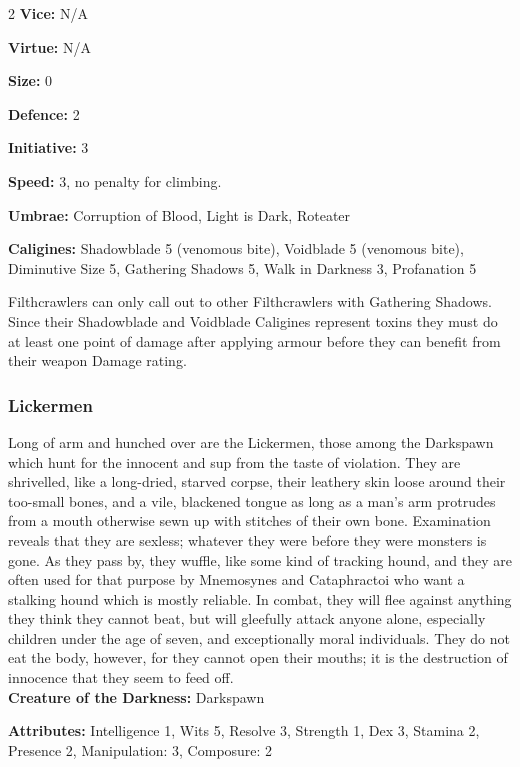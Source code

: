 \begin{multicols}{2}
\noindent \textbf{Vice:} N/A

\noindent \textbf{Virtue:} N/A

\noindent \textbf{Size:} 0

\noindent \textbf{Defence:} 2

\noindent \textbf{Initiative:} 3

\noindent \textbf{Speed:} 3, no penalty for climbing.

\noindent \textbf{Umbrae:} Corruption of Blood, Light is Dark, Roteater

\noindent \textbf{Caligines:} Shadowblade 5 (venomous bite), Voidblade 5 (venomous bite), Diminutive Size 5, Gathering Shadows 5, Walk in Darkness 3, Profanation 5

\noindent Filthcrawlers can only call out to other Filthcrawlers with Gathering Shadows. Since their Shadowblade and Voidblade Caligines represent toxins they must do at least one point of damage after applying armour before they can benefit from their weapon Damage rating. 


\subsubsection*{Lickermen}

Long of arm and hunched over are the Lickermen, those among the Darkspawn which hunt for the innocent and sup from the taste of violation. They are shrivelled, like a long-dried, starved corpse, their leathery skin loose around their too-small bones, and a vile, blackened tongue as long as a man's arm protrudes from a mouth otherwise sewn up with stitches of their own bone. Examination reveals that they are sexless; whatever they were before they were monsters is gone. As they pass by, they wuffle, like some kind of tracking hound, and they are often used for that purpose by Mnemosynes and Cataphractoi who want a stalking hound which is mostly reliable. In combat, they will flee against anything they think they cannot beat, but will gleefully attack anyone alone, especially children under the age of seven, and exceptionally moral individuals. They do not eat the body, however, for they cannot open their mouths; it is the destruction of innocence that they seem to feed off.\\

\noindent \textbf{Creature of the Darkness:} Darkspawn

\noindent \textbf{Attributes:} Intelligence 1, Wits 5, Resolve 3, Strength 1, Dex 3, Stamina 2, Presence 2, Manipulation: 3, Composure: 2


\end{multicols}

